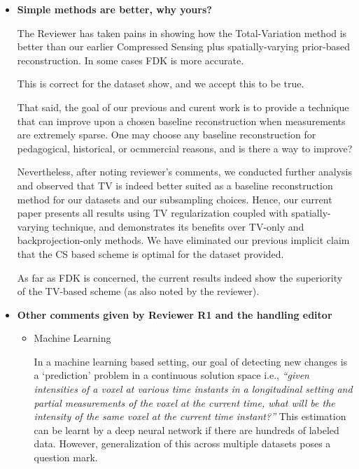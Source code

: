 \documentclass{article}
\begin{document}
\begin{itemize}
\item \textbf{Simple methods are better, why yours?}
  
The Reviewer has taken pains in showing how the Total-Variation method
is better than our earlier Compressed Sensing plus spatially-varying
prior-based reconstruction. In some cases FDK is more accurate.

This is correct for the dataset show, and we accept this to be true.

  That said, the goal of our previous and curent work is to provide a
  technique that can improve upon a chosen baseline reconstruction
  when measurements are extremely sparse. One may choose any baseline
  reconstruction for pedagogical, historical, or ocmmercial reasons,
  and is there a way to improve?
  
  Nevertheless, after noting reviewer's comments, we conducted further
  analysis and observed that TV is indeed better suited as a baseline
  reconstruction method for our datasets and our subsampling
  choices. Hence, our current paper presents all results using TV
  regularization coupled with spatially-varying technique, and
  demonstrates its benefits over TV-only and backprojection-only
  methods.  We have eliminated our previous implicit claim that the CS
  based scheme is optimal for the dataset provided.

  As far as FDK is concerned, the current results indeed show the
  superiority of the TV-based scheme (as also noted by the reviewer).
  
\item \textbf{Other comments given by Reviewer R1 and the handling editor}

 \begin{itemize}
  \item {Machine Learning}
  
  In a machine learning based setting, our goal of detecting new
  changes is a `prediction' problem in a continuous solution space
  i.e., \textit{``given intensities of a voxel at various time
    instants in a longitudinal setting and partial measurements of the
    voxel at the current time, what will be the intensity of the same
    voxel at the current time instant?''} This estimation can be
  learnt by a deep neural network if there are hundreds of labeled
  data.  However, generalization of this across multiple datasets
  poses a question mark. 
  


\end{itemize}
\end{itemize}
\end{document}
